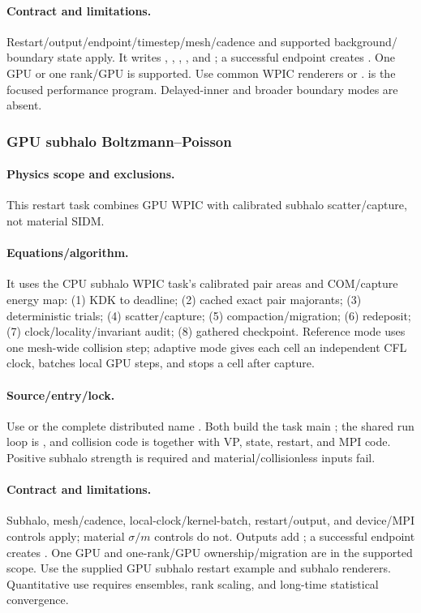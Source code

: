 \paragraph{Contract and limitations.}
Restart/output/endpoint/timestep/mesh/cadence and supported background/
boundary state apply.  It writes ,
, ,
, and ; a successful
endpoint creates .  One GPU or one rank/GPU is
supported.  Use common WPIC renderers or
.
 is the focused performance program.
Delayed-inner and broader boundary modes are absent.

\subsubsection{GPU subhalo Boltzmann--Poisson}
\paragraph{Physics scope and exclusions.}
This restart task combines GPU WPIC with calibrated
subhalo scatter/capture, not material SIDM.
\paragraph{Equations/algorithm.}
It uses the CPU subhalo WPIC task's calibrated pair areas and
COM/capture energy map:
(1) KDK to deadline; (2) cached exact pair majorants; (3) deterministic
trials; (4) scatter/capture; (5) compaction/migration; (6) redeposit;
(7) clock/locality/invariant audit; (8) gathered checkpoint.  Reference mode
uses one mesh-wide collision step; adaptive mode gives each cell an independent
CFL clock, batches local GPU steps, and stops a cell after capture.
\paragraph{Source/entry/lock.}
Use  or the complete distributed
name .  Both build the task main
; the shared run loop is
, and collision code is
 together with VP, state, restart, and
MPI code.  Positive
subhalo strength is required and material/collisionless inputs fail.
\paragraph{Contract and limitations.}
Subhalo, mesh/cadence, local-clock/kernel-batch, restart/output, and device/MPI controls apply; material
\(\sigma/m\) controls do not.  Outputs add
; a successful endpoint creates
.  One GPU and one-rank/GPU ownership/migration are in the
supported scope.  Use the supplied GPU subhalo restart example and subhalo
renderers.  Quantitative use requires ensembles, rank scaling, and long-time
statistical convergence.

